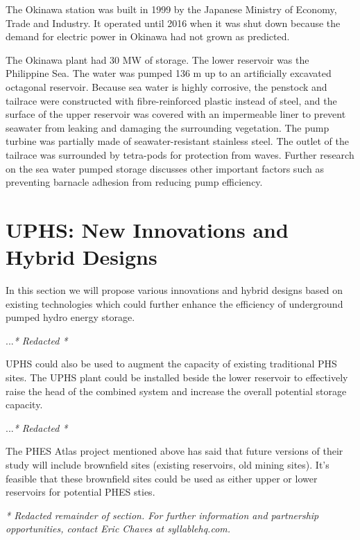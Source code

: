 \documentclass[hidelinks,12pt,a4paper]{article}
\begin{document}
The Okinawa station was built in 1999 by the Japanese Ministry of Economy, Trade and Industry. It operated until 2016 when it was shut down because the demand for electric power in Okinawa had not grown as predicted. \cite{ExperimentalPowerPlantInKunigamiDismantled}

The Okinawa plant had 30 MW of storage. The lower reservoir was the Philippine Sea. The water was pumped 136 m up to an artificially excavated octagonal reservoir. Because sea water is highly corrosive, the
penstock and tailrace were constructed with fibre-reinforced plastic instead of steel, and the surface of the upper reservoir was covered with an impermeable liner to prevent seawater from leaking and damaging the surrounding vegetation. The pump turbine was partially made of seawater-resistant stainless steel. \cite{SeaWaterPumpedStoragePowerPlant} The outlet of the tailrace was  surrounded by tetra-pods for protection from waves. \cite{DevelopmentOfPumpTurbineForSeawaterPumpedStorage} Further research on the sea water pumped storage discusses other important factors such as preventing barnacle adhesion from reducing pump efficiency. \cite{DevelopmentOfPumpTurbineForSeawaterPumpedStorage}


\pagebreak[4]
\section{UPHS: New Innovations and Hybrid Designs}
In this section we will propose various innovations and hybrid designs based on existing technologies which could further enhance the efficiency of underground pumped hydro energy storage.

...\textit{* Redacted *}

UPHS could also be used to augment the capacity of existing traditional PHS sites. The UPHS plant could be installed beside the lower reservoir to effectively raise the head of the combined system and increase the overall potential storage capacity.

...\textit{* Redacted *}

The PHES Atlas project mentioned above has said that future versions of their study will include brownfield sites (existing reservoirs, old mining sites). It's feasible that these brownfield sites could be used as either upper or lower reservoirs for potential PHES sties.

\textit{* Redacted remainder of section. For further information and partnership opportunities, contact Eric Chaves at syllablehq.com.}
\end{document}
